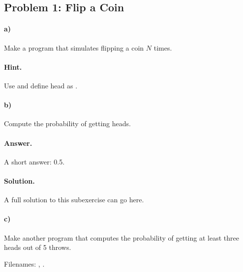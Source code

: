 \documentclass[%
oneside,                 %
final,                   %
chapterprefix=true,      %
open=right               %
10pt]{book}
\newenvironment{exercise}{}{}
\newcounter{exerno}
\begin{document}
\begin{exercise}

\subsection*{Problem 1: Flip a Coin}
\label{demo:ex:1}


\paragraph{a)}
Make a program that simulates flipping a coin $N$ times.


\paragraph{Hint.}
Use  and define head as .

\paragraph{b)}
Compute the probability of getting heads.


\paragraph{Answer.}
A short answer: 0.5.


\paragraph{Solution.}
A full solution to this subexercise can go here.

\paragraph{c)}
Make another program that computes the probability
of getting at least three heads out of 5 throws.

Filenames: , .

\end{exercise}
\end{document}
